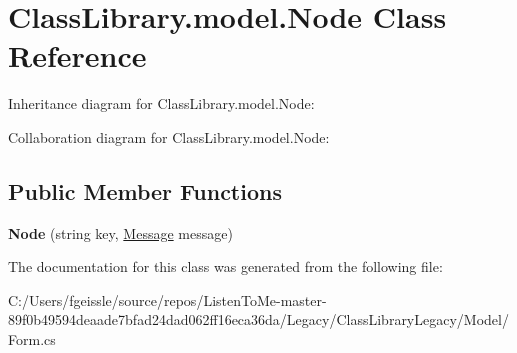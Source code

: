 \hypertarget{class_class_library_1_1model_1_1_node}{}\section{Class\+Library.\+model.\+Node Class Reference}
\label{class_class_library_1_1model_1_1_node}


Inheritance diagram for Class\+Library.\+model.\+Node\+:


Collaboration diagram for Class\+Library.\+model.\+Node\+:
\subsection*{Public Member Functions}
\begin{DoxyCompactItemize}
\item 
\mbox{\label{class_class_library_1_1model_1_1_node_a98404a4b188f190f5ee1ab7e4fddd5ca}} 
{\bfseries Node} (string key, \mbox{\hyperlink{class_class_library_1_1model_1_1_message}{Message}} message)
\end{DoxyCompactItemize}


The documentation for this class was generated from the following file\+:\begin{DoxyCompactItemize}
\item 
C\+:/\+Users/fgeissle/source/repos/\+Listen\+To\+Me-\/master-\/89f0b49594deaade7bfad24dad062ff16eca36da/\+Legacy/\+Class\+Library\+Legacy/\+Model/Form.\+cs\end{DoxyCompactItemize}
